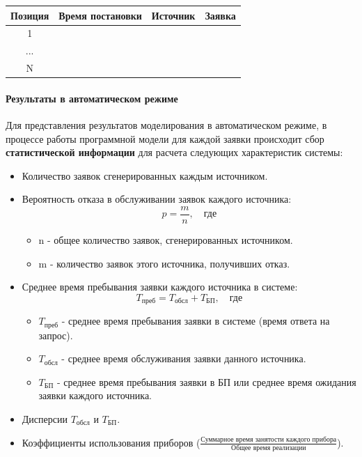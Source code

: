 \documentclass[a4paper, 14pt]{article}
\begin{document}
\begin{itemize}
	      \begin{center}
		      \begin{tabular}{|c|c|c|c|}
			      \hline
			      Позиция & Время постановки & Источник & Заявка \\
			      \hline
			      1       &                  &          &        \\
			      \hline
			      ...     &                  &          &        \\
			      \hline
			      N       &                  &          &        \\
			      \hline
		      \end{tabular}
	      \end{center}
\end{itemize}

\paragraph{Результаты в автоматическом режиме}

Для представления результатов моделирования в автоматическом режиме, в процессе работы программной модели для каждой заявки происходит сбор \textbf{статистической информации} для расчета следующих характеристик системы:

\begin{itemize}
	\item Количество заявок сгенерированных каждым источником.
	\item Вероятность отказа в обслуживании заявок каждого источника:
	      $$p=\frac{m}{n}, \quad \text{где}$$
	      \begin{itemize}
		      \item n - общее количество заявок, сгенерированных источником.
		      \item m - количество заявок этого источника, получивших отказ.
	      \end{itemize}
	\item Среднее время пребывания заявки каждого источника в системе:
	      $$T_{\text{преб}} = T_{\text{обсл}} + T_{\text{БП}}, \quad \text{где}$$
	      \begin{itemize}
		      \item $T_{\text{преб}}$ - среднее время пребывания заявки в системе (время ответа на запрос).
		      \item $T_{\text{обсл}}$ - среднее время обслуживания заявки данного источника.
		      \item $T_{\text{БП}}$ - среднее время пребывания заявки в БП или среднее время ожидания заявки каждого источника.
	      \end{itemize}
	\item Дисперсии $T_{\text{обсл}}$ и $T_{\text{БП}}$.
	\item Коэффициенты использования приборов ($\frac{\text{Суммарное время занятости каждого прибора}}{\text{Общее время реализации}}$).
\end{itemize}
\end{document}
